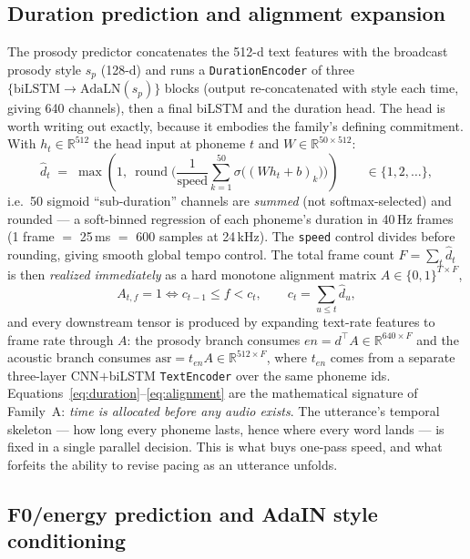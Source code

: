 \documentclass[11pt,a4paper]{article}
\newcommand{\R}{\mathbb{R}}
\newcommand{\code}[1]{\texttt{#1}}
\begin{document}
\subsection{Duration prediction and alignment expansion}
\label{sec:kokoro-duration}

The prosody predictor concatenates the 512-d text features with the broadcast prosody
style $s_p$ (128-d) and runs a \code{DurationEncoder} of three
$\{\text{biLSTM} \to \text{AdaLN}(s_p)\}$ blocks (output re-concatenated with style each
time, giving 640 channels), then a final biLSTM and the duration head. The head is worth
writing out exactly, because it embodies the family's defining commitment. With
$h_t \in \R^{512}$ the head input at phoneme $t$ and $W \in \R^{50\times512}$:
\begin{equation}
\hat d_t \;=\; \max\!\left(1,\ \operatorname{round}\!\Big( \frac{1}{\mathrm{speed}}
\sum_{k=1}^{50} \sigma\!\big( (W h_t + b)_k \big) \Big) \right)
\qquad \in \{1,2,\dots\},
\label{eq:duration}
\end{equation}
i.e.\ 50 sigmoid ``sub-duration'' channels are \emph{summed} (not softmax-selected) and
rounded --- a soft-binned regression of each phoneme's duration in 40\,Hz frames
(1 frame $=$ 25\,ms $=$ 600 samples at 24\,kHz). The \code{speed} control divides before
rounding, giving smooth global tempo control. The total frame count
$F = \sum_t \hat d_t$ is then \emph{realized immediately} as a hard monotone alignment
matrix $A \in \{0,1\}^{T\times F}$,
\begin{equation}
A_{t,f} = 1 \iff c_{t-1} \le f < c_t, \qquad c_t = \textstyle\sum_{u\le t}\hat d_u ,
\label{eq:alignment}
\end{equation}
and every downstream tensor is produced by expanding text-rate features to frame rate
through $A$: the prosody branch consumes $en = d^{\top}A \in \R^{640\times F}$ and the
acoustic branch consumes $\mathrm{asr} = t_{en}A \in \R^{512\times F}$, where $t_{en}$
comes from a separate three-layer CNN$+$biLSTM \code{TextEncoder} over the same phoneme
ids. Equations~\eqref{eq:duration}--\eqref{eq:alignment} are the mathematical signature
of Family~A: \emph{time is allocated before any audio exists}. The utterance's temporal
skeleton --- how long every phoneme lasts, hence where every word lands --- is fixed in a
single parallel decision. This is what buys one-pass speed, and what forfeits the ability
to revise pacing as an utterance unfolds.

\subsection{F0/energy prediction and AdaIN style conditioning}
\label{sec:kokoro-f0}
\end{document}
